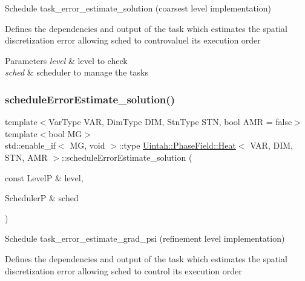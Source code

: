 Schedule task\+\_\+error\+\_\+estimate\+\_\+solution (coarsest level implementation) 

Defines the dependencies and output of the task which estimates the spatial discretization error allowing sched to controvaluel its execution order


\begin{DoxyParams}{Parameters}
{\em level} & level to check \\
\hline
{\em sched} & scheduler to manage the tasks \\
\hline
\end{DoxyParams}
\mbox{\label{classUintah_1_1PhaseField_1_1Heat_a409db9828b044c7f8aec3b9833239678}} 
\subsubsection{\texorpdfstring{schedule\+Error\+Estimate\+\_\+solution()}{scheduleErrorEstimate\_solution()}\hspace{0.1cm}{\footnotesize\ttfamily [2/2]}}
{\footnotesize\ttfamily template$<$Var\+Type V\+AR, Dim\+Type D\+IM, Stn\+Type S\+TN, bool A\+MR = false$>$ \\
template$<$bool MG$>$ \\
std\+::enable\+\_\+if$<$ MG, void $>$\+::type \hyperlink{classUintah_1_1PhaseField_1_1Heat}{Uintah\+::\+Phase\+Field\+::\+Heat}$<$ V\+AR, D\+IM, S\+TN, A\+MR $>$\+::schedule\+Error\+Estimate\+\_\+solution (\begin{DoxyParamCaption}\item[{const LevelP \&}]{level,  }\item[{SchedulerP \&}]{sched }\end{DoxyParamCaption})\hspace{0.3cm}{\ttfamily [protected]}}



Schedule task\+\_\+error\+\_\+estimate\+\_\+grad\+\_\+psi (refinement level implementation) 

Defines the dependencies and output of the task which estimates the spatial discretization error allowing sched to control its execution order


